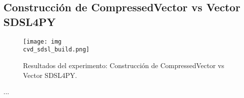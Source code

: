 \subsection{Construcción de CompressedVector vs Vector SDSL4PY}
\label{exp:build-cv-sdsl}

\begin{figure}[H]
    \centering
    \texttt{[image: img\\cvd\_sdsl\_build.png]}
    \caption{Resultados del experimento: Construcción de CompressedVector vs Vector SDSL4PY.}
    \label{fig:build-cv-sdsl}
\end{figure}

...
